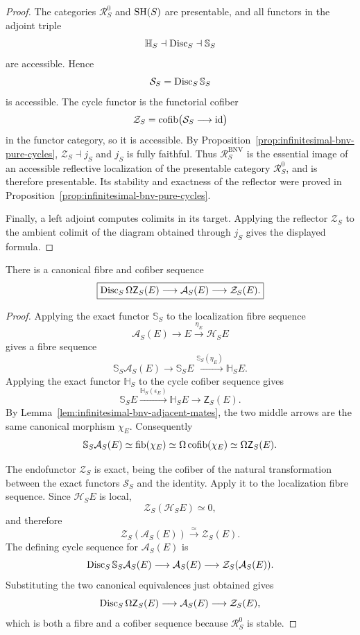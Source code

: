 \begin{proof}
The categories \(\mathcal R_S^0\) and \(\mathrm{SH}(S)\) are presentable, and all
functors in the adjoint triple
\[
    \mathbb H_S\dashv\operatorname{Disc}_S\dashv\mathbb S_S
\]
are accessible.  Hence
\[
    \mathcal S_S=\operatorname{Disc}_S\mathbb S_S
\]
is accessible.  The cycle functor is the functorial cofiber
\[
    \mathcal Z_S
    =
    \operatorname{cofib}\bigl(\mathcal S_S\longrightarrow\operatorname{id}\bigr)
\]
in the functor category, so it is accessible.  By
Proposition~\ref{prop:infinitesimal-bnv-pure-cycles},
\(\mathcal Z_S\dashv j_S\) and \(j_S\) is fully faithful.  Thus
\(\mathcal R_S^{\mathrm{BNV}}\) is the essential image of an accessible
reflective localization of the presentable category \(\mathcal R_S^0\), and
is therefore presentable.  Its stability and exactness of the reflector were
proved in Proposition~\ref{prop:infinitesimal-bnv-pure-cycles}.

Finally, a left adjoint computes colimits in its target.  Applying the
reflector \(\mathcal Z_S\) to the ambient colimit of the diagram obtained through
\(j_S\) gives the displayed formula.
\end{proof}

\begin{theorem}
\label{thm:infinitesimal-bnv-upper-triangle}
There is a canonical fibre and cofiber sequence
\[
    \boxed{
    \operatorname{Disc}_S\Omega\mathsf Z_S(E)
    \longrightarrow
    \mathcal A_S(E)
    \longrightarrow
    \mathcal Z_S(E).
    }
\]
\end{theorem}

\begin{proof}
Applying the exact functor $\mathbb S_S$ to the localization fibre sequence
\[
    \mathcal A_S(E)\longrightarrow E
    \xrightarrow{\eta_E}\mathcal H_SE
\]
gives a fibre sequence
\[
    \mathbb S_S\mathcal A_S(E)
    \longrightarrow
    \mathbb S_SE
    \xrightarrow{\mathbb S_S(\eta_E)}
    \mathbb H_SE.
\]
Applying the exact functor $\mathbb H_S$ to the cycle cofiber sequence gives
\[
    \mathbb S_SE
    \xrightarrow{\mathbb H_S(\epsilon_E)}
    \mathbb H_SE
    \longrightarrow
    \mathsf Z_S(E).
\]
By Lemma~\ref{lem:infinitesimal-bnv-adjacent-mates}, the two middle arrows
are the same canonical morphism $\chi_E$.  Consequently
\[
    \mathbb S_S\mathcal A_S(E)
    \simeq
    \operatorname{fib}(\chi_E)
    \simeq
    \Omega\operatorname{cofib}(\chi_E)
    \simeq
    \Omega\mathsf Z_S(E).
\]

The endofunctor $\mathcal Z_S$ is exact, being the cofiber of the natural
transformation between the exact functors $\mathcal S_S$ and the identity.
Apply it to the localization fibre sequence.  Since $\mathcal H_SE$ is local,
\[
    \mathcal Z_S(\mathcal H_SE)\simeq0,
\]
and therefore
\[
    \mathcal Z_S(\mathcal A_S(E))
    \xrightarrow{\simeq}
    \mathcal Z_S(E).
\]
The defining cycle sequence for $\mathcal A_S(E)$ is
\[
    \operatorname{Disc}_S\mathbb S_S\mathcal A_S(E)
    \longrightarrow
    \mathcal A_S(E)
    \longrightarrow
    \mathcal Z_S(\mathcal A_S(E)).
\]
Substituting the two canonical equivalences just obtained gives
\[
    \operatorname{Disc}_S\Omega\mathsf Z_S(E)
    \longrightarrow
    \mathcal A_S(E)
    \longrightarrow
    \mathcal Z_S(E),
\]
which is both a fibre and a cofiber sequence because $\mathcal R_S^0$ is
stable.
\end{proof}

